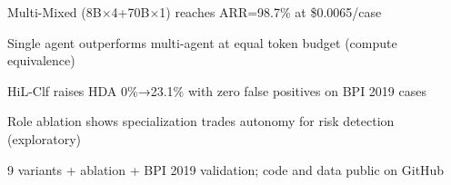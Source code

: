 
\begin{highlights}
\item Multi-Mixed (8B$\times$4+70B$\times$1) reaches ARR=98.7\% at \$0.0065/case
\item Single agent outperforms multi-agent at equal token budget (compute equivalence)
\item HiL-Clf raises HDA 0\%→23.1\% with zero false positives on BPI 2019 cases
\item Role ablation shows specialization trades autonomy for risk detection (exploratory)
\item 9 variants + ablation + BPI 2019 validation; code and data public on GitHub
\end{highlights}
